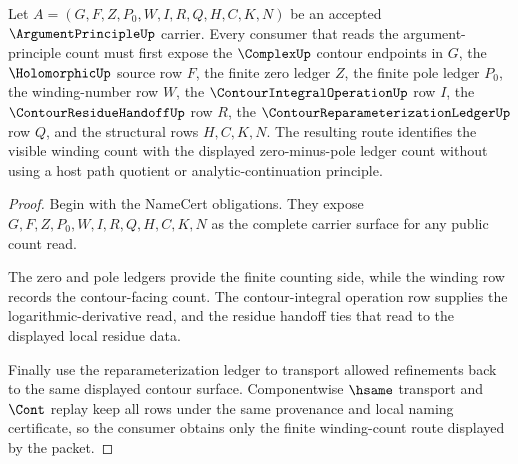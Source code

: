 \begin{theorem}
\label{thm:argument-principle-winding-number-route}
Let $A=(G,F,Z,P_0,W,I,R,Q,H,C,K,N)$ be an accepted $\ArgumentPrincipleUp$ carrier. Every consumer that reads the argument-principle count must first expose the $\ComplexUp$ contour endpoints in $G$, the $\HolomorphicUp$ source row $F$, the finite zero ledger $Z$, the finite pole ledger $P_0$, the winding-number row $W$, the $\ContourIntegralOperationUp$ row $I$, the $\ContourResidueHandoffUp$ row $R$, the $\ContourReparameterizationLedgerUp$ row $Q$, and the structural rows $H,C,K,N$. The resulting route identifies the visible winding count with the displayed zero-minus-pole ledger count without using a host path quotient or analytic-continuation principle.
\end{theorem}
\begin{proof}
Begin with the NameCert obligations. They expose $G,F,Z,P_0,W,I,R,Q,H,C,K,N$ as the complete carrier surface for any public count read.

The zero and pole ledgers provide the finite counting side, while the winding row records the contour-facing count. The contour-integral operation row supplies the logarithmic-derivative read, and the residue handoff ties that read to the displayed local residue data.

Finally use the reparameterization ledger to transport allowed refinements back to the same displayed contour surface. Componentwise $\hsame$ transport and $\Cont$ replay keep all rows under the same provenance and local naming certificate, so the consumer obtains only the finite winding-count route displayed by the packet.
\end{proof}




